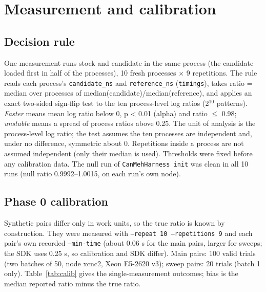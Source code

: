 \documentclass[10pt,a4paper]{article}
\begin{document}
\section{Measurement and calibration}
\subsection{Decision rule}
One measurement runs stock and candidate in the same process (the candidate loaded first in half of the processes), 10 fresh processes $\times$ 9 repetitions. The rule reads each process's \texttt{candidate\_ns} and \texttt{reference\_ns} (\texttt{timings}), takes ratio = median over processes of median(candidate)/median(reference), and applies an exact two-sided sign-flip test to the ten process-level log ratios (2$^{10}$ patterns). \emph{Faster} means mean log ratio below 0, p < 0.01 (alpha) and ratio $\le$ 0.98; \emph{unstable} means a spread of process ratios above 0.25. The unit of analysis is the process-level log ratio; the test assumes the ten processes are independent and, under no difference, symmetric about 0. Repetitions inside a process are not assumed independent (only their median is used). Thresholds were fixed before any calibration data. The null run of \texttt{CanMehHarness init} was clean in all 10 runs (null ratio 0.9992--1.0015, on each run's own node).

\subsection{Phase 0 calibration}
Synthetic pairs differ only in work units, so the true ratio is known by construction. They were measured with \texttt{--repeat 10 --repetitions 9} and each pair's own recorded \texttt{--min-time} (about 0.06 s for the main pairs, larger for sweeps; the SDK uses 0.25 s, so calibration and SDK differ). Main pairs: 100 valid trials (two batches of 50, node xcnc2, Xeon E5-2620 v3); sweep pairs: 20 trials (batch 1 only). Table~\ref{tab:calib} gives the single-measurement outcomes; bias is the median reported ratio minus the true ratio.
\end{document}
